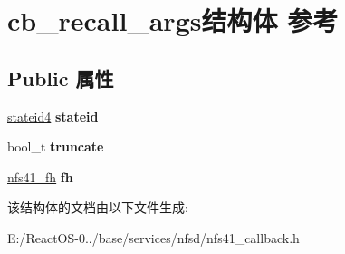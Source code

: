 \hypertarget{structcb__recall__args}{}\section{cb\+\_\+recall\+\_\+args结构体 参考}
\label{structcb__recall__args}
\subsection*{Public 属性}
\begin{DoxyCompactItemize}
\item 
\mbox{\label{structcb__recall__args_ae0f4c4a1130360ef89d74e1542a6b803}} 
\hyperlink{struct____stateid4}{stateid4} {\bfseries stateid}
\item 
\mbox{\label{structcb__recall__args_a439c774e7460107cfeb5cfade2be4077}} 
bool\+\_\+t {\bfseries truncate}
\item 
\mbox{\label{structcb__recall__args_a03908ade8e608bb015aab2d0720b6dd4}} 
\hyperlink{struct____nfs41__fh}{nfs41\+\_\+fh} {\bfseries fh}
\end{DoxyCompactItemize}


该结构体的文档由以下文件生成\+:\begin{DoxyCompactItemize}
\item 
E\+:/\+React\+O\+S-\/0../base/services/nfsd/nfs41\+\_\+callback.\+h\end{DoxyCompactItemize}
